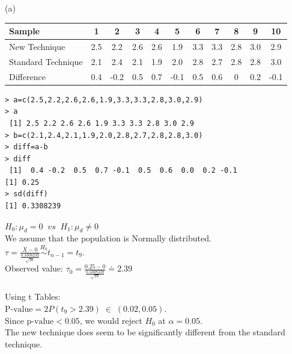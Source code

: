\documentclass[bigtut]{tutorial}\usepackage[]{graphicx}\usepackage[]{color}
\begin{document}
\begin{tutorial}
\begin{questions}


\begin{solution}
(a)

\begin{tabular}{|l|cccccccccc|}\hline
 Sample &1&2&3&4&5&6&7&8&9&10\\ \hline
New Technique     &2.5 &2.2 &2.6 &2.6 &1.9 &3.3 &3.3 &2.8 &3.0 &2.9\\
Standard Technique &2.1 &2.4 &2.1 &1.9 &2.0 &2.8 &2.7 &2.8 &2.8 &3.0\\ \hline
Difference & 0.4 & -0.2 & 0.5 & 0.7 & -0.1 & 0.5 & 0.6 & 0 & 0.2 & -0.1 \\ \hline
\end{tabular}

\vspace{.5cm}
\begin{verbatim}
> a=c(2.5,2.2,2.6,2.6,1.9,3.3,3.3,2.8,3.0,2.9)
> a
 [1] 2.5 2.2 2.6 2.6 1.9 3.3 3.3 2.8 3.0 2.9
> b=c(2.1,2.4,2.1,1.9,2.0,2.8,2.7,2.8,2.8,3.0)
> diff=a-b
> diff
 [1]  0.4 -0.2  0.5  0.7 -0.1  0.5  0.6  0.0  0.2 -0.1
[1] 0.25
> sd(diff)
[1] 0.3308239
\end{verbatim}

\vspace{.5cm}
$H_0: \mu_{d}=0  \;\; vs \;\; H_1: \mu_{d} \neq 0$ \\

We assume that the population is Normally distributed. \\

$\tau = \frac{ \bar{X} - 0 }{ \frac{0.3308239}{\sqrt{10}}   }   \overset{H_0}{\sim}  t_{n-1} = t_{9}$. \\
Observed value: $\tau_{0} = \frac{0.25-0}{\frac{0.3308239}{\sqrt{10}} }  \doteq  2.39 $ \\

 \\

Using t Tables: \\
$\text{P-value} = 2 P( t_{9} >  2.39 ) \; \in \; (0.02,0.05)$. \\

\vspace{.5cm}
Since $\text{p-value} < 0.05$, we would reject $H_{0}$ at $\alpha = 0.05$. \\
The new technique does seem to be significantly different from the standard technique. \\


\end{solution}
\end{questions}
\end{tutorial}
\end{document}
